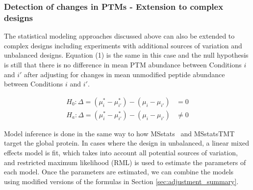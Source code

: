 \documentclass[mcp]{article}
\numberwithin{figure}{section} %
\numberwithin{table}{section}
\begin{document}

\subsubsection*{Detection of changes in PTMs - Extension to complex designs}

The statistical modeling approaches discussed above can also be extended to complex designs including experiments with additional sources of variation and unbalanced designs. Equation (1) is the same in this case and the null hypothesis is still that there is no difference in mean PTM abundance between Conditions $i$ and $i'$ after adjusting for changes in mean unmodified peptide abundance between Conditions $i$ and $i'$. 

\begin{align*}
H_{0}: \Delta = (\mu_{i}^{\ast} - \mu_{i'}^{\ast}) - (\mu_{i} - \mu_{i'}) &= 0 \\
H_{a}: \Delta = (\mu_{i}^{\ast} - \mu_{i'}^{\ast}) - (\mu_{i} - \mu_{i'}) &\neq 0
\end{align*}

Model inference is done in the same way to how MSstats~\cite{choi_etal_14a} and MSstatsTMT~\cite{Huang:2020} target the global protein. In cases where the design in unbalanced, a linear mixed effects model is fit, which takes into account all potential sources of variation, and restricted maximum likelihood (RML) is used to estimate the parameters of each model. Once the parameters are estimated, we can combine the models using modified versions of the formulas in Section \ref{sec:adjustment_summary}.
\end{document}
